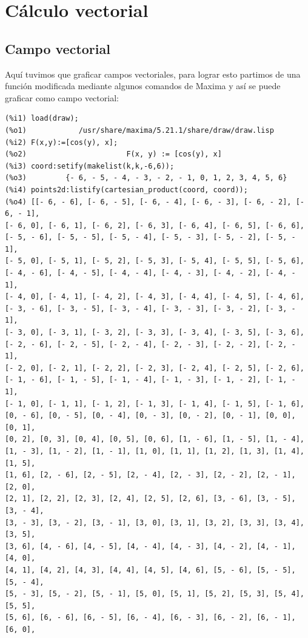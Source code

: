 \documentclass[12pt,letterpaper]{article}
\begin{document}
\section{Cálculo vectorial}

\subsection{Campo vectorial}
Aquí tuvimos que graficar campos vectoriales, para lograr esto partimos de una función modificada mediante algunos comandos de Maxima y así se puede graficar como campo vectorial: 

\begin{verbatim}
(%i1) load(draw);
(%o1)            /usr/share/maxima/5.21.1/share/draw/draw.lisp
(%i2) F(x,y):=[cos(y), x];
(%o2)                       F(x, y) := [cos(y), x]
(%i3) coord:setify(makelist(k,k,-6,6));
(%o3)         {- 6, - 5, - 4, - 3, - 2, - 1, 0, 1, 2, 3, 4, 5, 6}
(%i4) points2d:listify(cartesian_product(coord, coord));
(%o4) [[- 6, - 6], [- 6, - 5], [- 6, - 4], [- 6, - 3], [- 6, - 2], [- 6, - 1], 
[- 6, 0], [- 6, 1], [- 6, 2], [- 6, 3], [- 6, 4], [- 6, 5], [- 6, 6], 
[- 5, - 6], [- 5, - 5], [- 5, - 4], [- 5, - 3], [- 5, - 2], [- 5, - 1], 
[- 5, 0], [- 5, 1], [- 5, 2], [- 5, 3], [- 5, 4], [- 5, 5], [- 5, 6], 
[- 4, - 6], [- 4, - 5], [- 4, - 4], [- 4, - 3], [- 4, - 2], [- 4, - 1], 
[- 4, 0], [- 4, 1], [- 4, 2], [- 4, 3], [- 4, 4], [- 4, 5], [- 4, 6], 
[- 3, - 6], [- 3, - 5], [- 3, - 4], [- 3, - 3], [- 3, - 2], [- 3, - 1], 
[- 3, 0], [- 3, 1], [- 3, 2], [- 3, 3], [- 3, 4], [- 3, 5], [- 3, 6], 
[- 2, - 6], [- 2, - 5], [- 2, - 4], [- 2, - 3], [- 2, - 2], [- 2, - 1], 
[- 2, 0], [- 2, 1], [- 2, 2], [- 2, 3], [- 2, 4], [- 2, 5], [- 2, 6], 
[- 1, - 6], [- 1, - 5], [- 1, - 4], [- 1, - 3], [- 1, - 2], [- 1, - 1], 
[- 1, 0], [- 1, 1], [- 1, 2], [- 1, 3], [- 1, 4], [- 1, 5], [- 1, 6], 
[0, - 6], [0, - 5], [0, - 4], [0, - 3], [0, - 2], [0, - 1], [0, 0], [0, 1], 
[0, 2], [0, 3], [0, 4], [0, 5], [0, 6], [1, - 6], [1, - 5], [1, - 4], 
[1, - 3], [1, - 2], [1, - 1], [1, 0], [1, 1], [1, 2], [1, 3], [1, 4], [1, 5], 
[1, 6], [2, - 6], [2, - 5], [2, - 4], [2, - 3], [2, - 2], [2, - 1], [2, 0], 
[2, 1], [2, 2], [2, 3], [2, 4], [2, 5], [2, 6], [3, - 6], [3, - 5], [3, - 4], 
[3, - 3], [3, - 2], [3, - 1], [3, 0], [3, 1], [3, 2], [3, 3], [3, 4], [3, 5], 
[3, 6], [4, - 6], [4, - 5], [4, - 4], [4, - 3], [4, - 2], [4, - 1], [4, 0], 
[4, 1], [4, 2], [4, 3], [4, 4], [4, 5], [4, 6], [5, - 6], [5, - 5], [5, - 4], 
[5, - 3], [5, - 2], [5, - 1], [5, 0], [5, 1], [5, 2], [5, 3], [5, 4], [5, 5], 
[5, 6], [6, - 6], [6, - 5], [6, - 4], [6, - 3], [6, - 2], [6, - 1], [6, 0], 

\end{verbatim}
\end{document}

